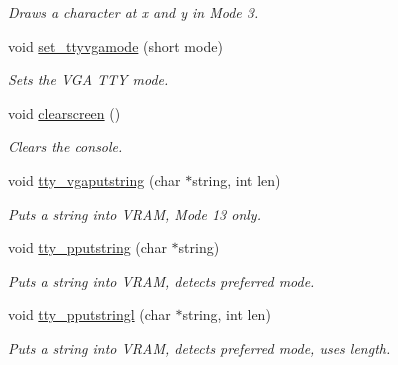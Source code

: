 \begin{DoxyCompactItemize}
\begin{DoxyCompactList}\small\item\em Draws a character at x and y in Mode 3. \end{DoxyCompactList}\item 
void \hyperlink{a00173_aaf55ee008e2e63ca97eacae371646db7_aaf55ee008e2e63ca97eacae371646db7}{set\+\_\+ttyvgamode} (short mode)
\begin{DoxyCompactList}\small\item\em Sets the V\+GA T\+TY mode. \end{DoxyCompactList}\item 
void \hyperlink{a00173_aff4bc17c602603d120756f52e18ebb96_aff4bc17c602603d120756f52e18ebb96}{clearscreen} ()
\begin{DoxyCompactList}\small\item\em Clears the console. \end{DoxyCompactList}\item 
void \hyperlink{a00173_a05ca3f5e64f38fec173b635ca8465415_a05ca3f5e64f38fec173b635ca8465415}{tty\+\_\+vgaputstring} (char $\ast$string, int len)
\begin{DoxyCompactList}\small\item\em Puts a string into V\+R\+AM, Mode 13 only. \end{DoxyCompactList}\item 
void \hyperlink{a00173_ade960b1320324706aac6c00cc6b1b2fe_ade960b1320324706aac6c00cc6b1b2fe}{tty\+\_\+pputstring} (char $\ast$string)
\begin{DoxyCompactList}\small\item\em Puts a string into V\+R\+AM, detects preferred mode. \end{DoxyCompactList}\item 
void \hyperlink{a00173_abaf93f9e56ddb7b10462070f59e534e4_abaf93f9e56ddb7b10462070f59e534e4}{tty\+\_\+pputstringl} (char $\ast$string, int len)
\begin{DoxyCompactList}\small\item\em Puts a string into V\+R\+AM, detects preferred mode, uses length. \end{DoxyCompactList}\end{DoxyCompactItemize}
